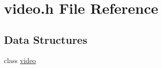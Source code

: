 \hypertarget{a00043}{\section{video.\-h File Reference}
\label{a00043}
}
\subsection*{Data Structures}
\begin{DoxyCompactItemize}
\item 
class \hyperlink{a00015}{video}
\end{DoxyCompactItemize}
